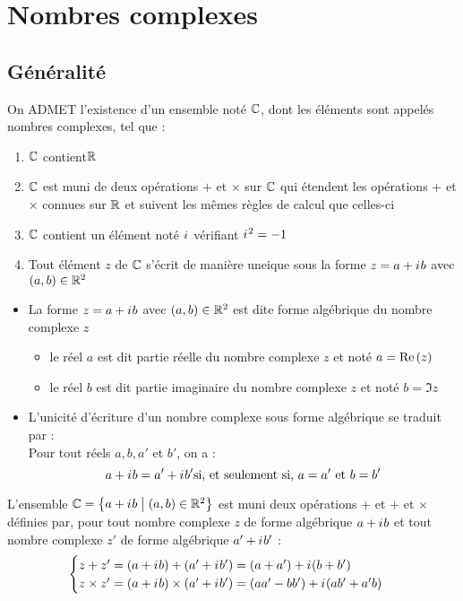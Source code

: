 \chapter{Nombres complexes}

\minitoc
\section{Généralité}
\begin{defi}[Propriété de \(\C\)]

	On ADMET l'existence d’un ensemble noté \(\C\), dont les éléments sont appelés nombres complexes, tel que :
	\begin{enumerate}
		\item \(\C\) contient\(\mathbb{R} \)
		\item \(\C\) est muni de deux opérations \(+\) et \(\times\) sur \(\C\) qui étendent les opérations \(+\) et \(\times\) connues sur \(\mathbb{R}\) et suivent les mêmes règles de calcul que celles-ci
		\item \(\C\) contient un élément noté \(i\mkern1mu\) vérifiant \(i\mkern1mu^2 = -1\)
		\item Tout élément \(z\) de \(\C\) s'écrit de manière uneique sous la forme \(z = a+i\mkern1mu b\) avec \(\left(a,b\right) \in \mathbb{R}^2\)
	\end{enumerate}
\end{defi}
\begin{rem}
	\begin{itemize}
		\item La forme \(z = a+i\mkern1mu b\)  avec \(\left(a,b\right) \in \mathbb{R}^2\) est dite forme algébrique du nombre complexe \(z\) \begin{itemize}
			      \item le réel \(a\) est dit partie réelle du nombre complexe \(z\) et noté \(a = \operatorname{Re}\left(z\right)\)
			      \item le réel \(b\) est dit partie imaginaire du nombre complexe \(z\) et noté \(b = \Im{z}\)
		      \end{itemize}
		\item L'unicité d'écriture d'un nombre complexe sous forme algébrique se traduit par : \\
		      Pour tout réels \(a,b,a'\) et \(b'\), on a :
		      \[a+i\mkern1mu b = a'+i\mkern1mu b' \text{si, et seulement si, } a=a' \text{ et } b= b'\]
	\end{itemize}
\end{rem}

\begin{defprop}
	L’ensemble \(\mathbb{C} = \left\lbrace a + i\mkern1mu b \;\middle|\; \left(a, b\right) \in \mathbb{R}^2\right\rbrace\) est muni deux opérations + et \(+\) et \(\times\) définies par, pour tout nombre complexe \(z\) de forme algébrique \(a + i\mkern1mu b\) et tout nombre complexe \(z'\) de forme algébrique \(a' + i\mkern1mu b'\) : \[\begin{cases}
			z+z' = (a+i\mkern1mu b) + (a'+i\mkern1mu b') = (a+a')+i\mkern1mu(b+b') \\
			z \times z' = (a+i\mkern1mu b) \times (a'+i\mkern1mu b') = (aa'-bb') + i\mkern1mu(ab'+a'b)
		\end{cases}\]
\end{defprop}

